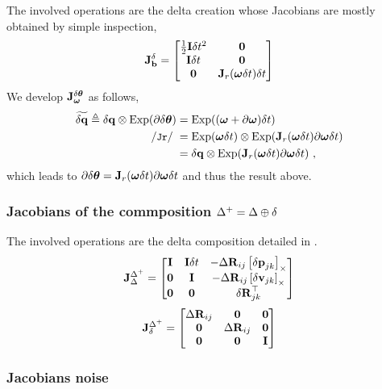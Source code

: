 The involved operations are the delta creation  whose Jacobians are mostly obtained by simple inspection,
%
\begin{align}
\jac{\delta}{\bfb} =
\begin{bmatrix}
\frac12\bfI\dt^2 	& \bf0 \\
\bfI\dt 			& \bf0 \\
\bf0 				& \bfJ_r(\bw\dt)\dt%
\end{bmatrix}
\end{align}
%
We develop ${\bf J}^{\delta{{\bm \theta}}}_{{\bm \omega}}$ as follows,
%
\begin{align*}
\widetilde\dq \te \dq\ot\Exp(\partial\dth) 
&= \Exp((\bw+\partial\bw)\dt) \\
\cJr &= \Exp(\bw\dt)\ot\Exp(\bfJ_r(\bw\dt)\partial\bw\dt) \\
&= \dq \ot \Exp(\bfJ_r(\bw\dt)\partial\bw\dt)
~,
\end{align*}
%
which leads to 
$\partial{\delta{{\bm \theta}}} = {\bf J}_r({{\bm \omega}}\delta t)\partial{{\bm \omega}}\delta t$ 
and thus the result above.



\subsubsection{Jacobians of the commposition $\Delta^+=\Delta\oplus\delta$}

The involved operations are the delta composition  detailed in .
%
\begin{align}
{{\bf J}^{\Delta^+}_{\Delta}} = \begin{bmatrix}
{\bf I}  & {\bf I}\delta t & - {\Delta{\bf R}}_{ij}  \left[{\delta{\bf p}}_{jk}\right]_\times  \\
\bf0  & {\bf I}    & - {\Delta{\bf R}}_{ij}  \left[{\delta{\bf v}}_{jk}\right]_\times \\
\bf0  & \bf0    &   {\delta{\bf R}}_{jk}^{\top} 
\end{bmatrix}
\end{align}
%
\begin{align}
{{\bf J}^{\Delta^+}_{\delta}} = \begin{bmatrix}
{\Delta{\bf R}}_{ij} & \bf0     & \bf0 \\
\bf0     & {\Delta{\bf R}}_{ij} & \bf0 \\
\bf0     & \bf0     & {\bf I}  
\end{bmatrix}
\end{align}

\subsubsection{Jacobians \wrt noise}

